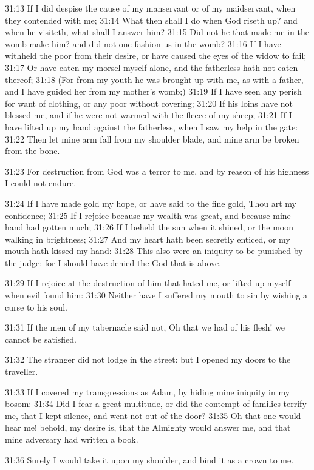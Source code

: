 31:13 If I did despise the cause of my manservant or of my maidservant, when they contended with me; 31:14 What then shall I do when God riseth up? and when he visiteth, what shall I answer him?  31:15 Did not he that made me in the womb make him? and did not one fashion us in the womb?  31:16 If I have withheld the poor from their desire, or have caused the eyes of the widow to fail; 31:17 Or have eaten my morsel myself alone, and the fatherless hath not eaten thereof; 31:18 (For from my youth he was brought up with me, as with a father, and I have guided her from my mother's womb;) 31:19 If I have seen any perish for want of clothing, or any poor without covering; 31:20 If his loins have not blessed me, and if he were not warmed with the fleece of my sheep; 31:21 If I have lifted up my hand against the fatherless, when I saw my help in the gate: 31:22 Then let mine arm fall from my shoulder blade, and mine arm be broken from the bone.

31:23 For destruction from God was a terror to me, and by reason of his highness I could not endure.

31:24 If I have made gold my hope, or have said to the fine gold, Thou art my confidence; 31:25 If I rejoice because my wealth was great, and because mine hand had gotten much; 31:26 If I beheld the sun when it shined, or the moon walking in brightness; 31:27 And my heart hath been secretly enticed, or my mouth hath kissed my hand: 31:28 This also were an iniquity to be punished by the judge: for I should have denied the God that is above.

31:29 If I rejoice at the destruction of him that hated me, or lifted up myself when evil found him: 31:30 Neither have I suffered my mouth to sin by wishing a curse to his soul.

31:31 If the men of my tabernacle said not, Oh that we had of his flesh!  we cannot be satisfied.

31:32 The stranger did not lodge in the street: but I opened my doors to the traveller.

31:33 If I covered my transgressions as Adam, by hiding mine iniquity in my bosom: 31:34 Did I fear a great multitude, or did the contempt of families terrify me, that I kept silence, and went not out of the door?  31:35 Oh that one would hear me! behold, my desire is, that the Almighty would answer me, and that mine adversary had written a book.

31:36 Surely I would take it upon my shoulder, and bind it as a crown to me.

